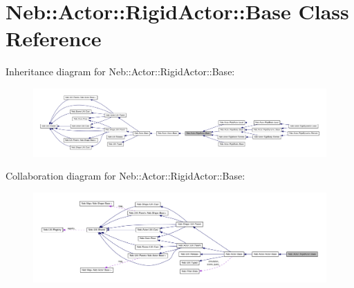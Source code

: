 \hypertarget{classNeb_1_1Actor_1_1RigidActor_1_1Base}{\section{\-Neb\-:\-:\-Actor\-:\-:\-Rigid\-Actor\-:\-:\-Base \-Class \-Reference}
\label{classNeb_1_1Actor_1_1RigidActor_1_1Base}
}


\-Inheritance diagram for \-Neb\-:\-:\-Actor\-:\-:\-Rigid\-Actor\-:\-:\-Base\-:\nopagebreak
\begin{figure}[H]
\begin{center}
\leavevmode
\includegraphics[width=350pt]{classNeb_1_1Actor_1_1RigidActor_1_1Base__inherit__graph}
\end{center}
\end{figure}


\-Collaboration diagram for \-Neb\-:\-:\-Actor\-:\-:\-Rigid\-Actor\-:\-:\-Base\-:\nopagebreak
\begin{figure}[H]
\begin{center}
\leavevmode
\includegraphics[width=350pt]{classNeb_1_1Actor_1_1RigidActor_1_1Base__coll__graph}
\end{center}
\end{figure}
